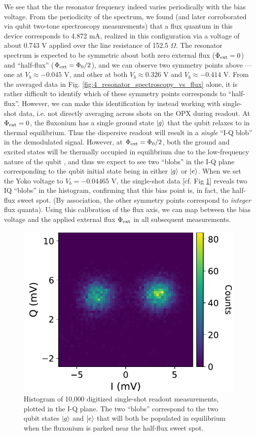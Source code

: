 We see that the the resonator frequency indeed varies periodically with the bias voltage. From the periodicity of the spectrum, we found (and later corroborated via qubit two-tone spectroscopy measurements) that a flux quantum in this device corresponds to 4.872 mA, realized in this configuration via a voltage of about 0.743 V applied over the line resistance of 152.5 $\Omega$. The resonator spectrum is expected to be symmetric about both zero external flux ($\Phi_{\rm ext} = 0$) and ``half-flux'' ($\Phi_{\rm ext} = \Phi_0/2$), and we can observe two symmetry points above --- one at $V_b \approx -0.045$ V, and other at both $V_b \approx 0.326$ V and $V_b \approx -0.414$ V. From the averaged data in Fig. \ref{fig:4_resonator_spectroscopy_vs_flux} alone, it is rather difficult to identify which of these symmetry points corresponds to ``half-flux''. However, we can make this identification by instead working with single-shot data, i.e. not directly averaging across shots on the OPX during readout. At $\Phi_{\rm ext} = 0$, the fluxonium has a single ground state $\lvert g\rangle$ that the qubit relaxes to in thermal equilibrium. Thus the dispersive readout will result in a \textit{single} ``I-Q blob'' in the demodulated signal. However, at $\Phi_{\rm ext} = \Phi_0/2$, both the ground and excited states will be thermally occupied in equilibrium due to the low-frequency nature of the qubit \cite{manenti2023quantum}, and thus we expect to see two ``blobs'' in the I-Q plane corresponding to the qubit initial state being in either $\lvert g\rangle$ or $\lvert e\rangle$. When we set the Yoko voltage to $V_b = -0.04465$ V, the single-shot data [cf. Fig \ref{fig:4_single_shots}] reveals two IQ ``blobs'' in the histogram, confirming that this bias point is, in fact, the half-flux sweet spot. (By association, the other symmetry points correspond to \textit{integer} flux quanta). Using this calibration of the flux axis, we can map between the bias voltage and the applied external flux $\Phi_{\rm ext}$ in all subsequent measurements. 

\begin{figure}[h]
    \centering
    \includegraphics[width=0.51\linewidth]{Figures/4/single_shots.pdf}
    \caption{Histogram of 10,000 digitized single-shot readout measurements, plotted in the I-Q plane. The two ``blobs'' correspond to the two qubit states $\lvert g\rangle$ and $\lvert e\rangle$ that will both be populated in equilibrium when the fluxonium is parked near the half-flux sweet spot.}
\label{fig:4_single_shots}
\end{figure}


